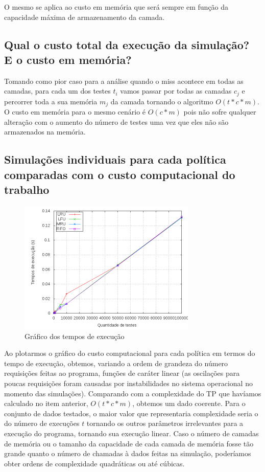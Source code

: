 \documentclass[12pt]{article}
\begin{document}
O mesmo se aplica ao custo em memória que será sempre em função da capacidade
máxima de armazenamento da camada.

\subsection{Qual o custo total da execução da simulação? E o custo em memória?}

Tomando como pior caso para a análise quando o miss acontece em todas as
camadas, para cada um dos testes $t_{i}$ vamos passar por todas as camadas
$c_{j}$ e percorrer toda a sua memória $m_{j}$ da camada tornando o algoritmo
$O(t*c*m)$. O custo em memória para o mesmo cenário é $O(c*m)$ pois não sofre
qualquer alteração com o aumento do número de testes uma vez que eles não são
armazenados na memória.

\newpage

\subsection{Simulações individuais para cada política comparadas com o custo
computacional do trabalho}

\begin{figure}[ht!]
\centering
\includegraphics[width=320px,height=240px]{testes.png}
\caption{Gráfico dos tempos de execução}
\end{figure}

Ao plotarmos o gráfico do custo computacional para cada política em termos do tempo de execução, obtemos, variando a ordem de grandeza do número requisições feitas ao programa, funções de caráter linear (as oscilações para poucas requisições foram causadas por instabilidades no sistema operacional no momento das simulações). Comparando com a complexidade do TP que havíamos calculado no item anterior, $O(t*c*m)$, obtemos um dado coerente. Para o conjunto de dados testados, o maior valor que representaria complexidade seria o do número de execuções $t$ tornando os outros parâmetros irrelevantes para a execução do programa, tornando sua execução linear. Caso o número de camadas de memória ou o tamanho da capacidade de cada camada de memória fosse tão grande quanto o número de chamadas à dados feitas na simulação, poderíamos obter ordens de complexidade quadráticas ou até cúbicas.
\end{document}
